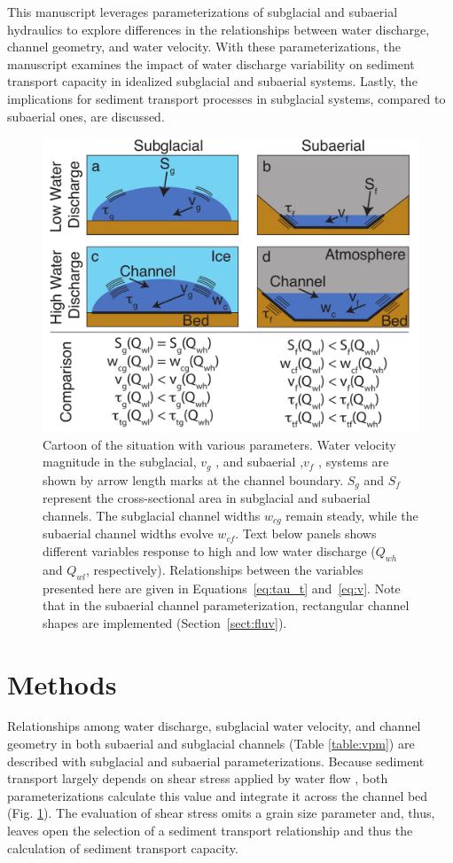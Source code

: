 \documentclass[11pt]{article}
\begin{document}
\begin{spacing}{1}
  This manuscript leverages parameterizations of subglacial and subaerial hydraulics to explore differences in the relationships between  water discharge, channel geometry, and water velocity. 
  With these parameterizations, the manuscript examines the impact of water discharge variability on sediment transport capacity in idealized subglacial and subaerial systems.
  Lastly, the implications for sediment transport processes in subglacial systems, compared to subaerial ones, are discussed.
  
  \begin{center}
    \begin{figure}[H]
      \includegraphics[width=0.65\linewidth]{Cartoon_text.pdf}
      \caption{Cartoon of the situation with various parameters. Water velocity magnitude in the subglacial, $v_g$ , and subaerial ,$v_f$ , systems are shown by arrow length marks at the channel boundary. $S_g$ and $S_f$ represent the cross-sectional area in subglacial and subaerial channels. The subglacial channel widths $w_{cg}$ remain steady, while the subaerial channel widths evolve $w_{cf}$. Text below panels shows different variables response to high and low water discharge ($Q_{wh}$ and $Q_{wl}$, respectively).
        Relationships between the variables presented here are given in Equations~\ref{eq:tau_t} and~\ref{eq:v}.
        Note that in the subaerial channel parameterization, rectangular channel shapes are implemented (Section~\ref{sect:fluv}).} 
      \label{fig:cartoon}
    \end{figure}
  \end{center}


  
  \section{Methods}
  \label{sect:meth}
  Relationships among water discharge, subglacial water velocity, and channel geometry in both subaerial and subglacial channels (Table \ref{table:vpm}) are described with subglacial and subaerial parameterizations.
  Because sediment transport largely depends on shear stress applied by water flow \citep{shields1936}, both parameterizations calculate this value and integrate  it across the channel bed (Fig. \ref{fig:cartoon}).
  The evaluation of shear stress  omits a grain size parameter and, thus, leaves open the selection of a sediment transport relationship  \citep{shields1936} and thus the calculation of sediment transport capacity.


\end{spacing}
\end{document}
